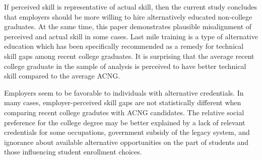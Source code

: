 \documentclass[review]{elsarticle}
\begin{document}
If perceived skill is representative of actual skill,
then the current study concludes that employers should be more willing to hire alternatively educated non-college graduates.
At the same time, this paper demonstrates plausible misalignment of perceived and actual skill in some cases.
Last mile training is a type of alternative education which has been specifically recommended as a remedy for technical skill gaps among recent college graduates.
It is surprising that the average recent college graduate in the sample of analysis is perceived to have better technical skill compared to the average ACNG.

Employers seem to be favorable to individuals with alternative credentials.
In many cases, employer-perceived skill gaps are not statistically different when comparing recent college gradutes with ACNG candidates.
The relative social preference for the college degree may be better explained by a lack of relevant credentials for some occupations,
government subsidy of the legacy system,
and ignorance about available alternative opportunities on the part of students and those influencing student enrollment choices.



\end{document}
